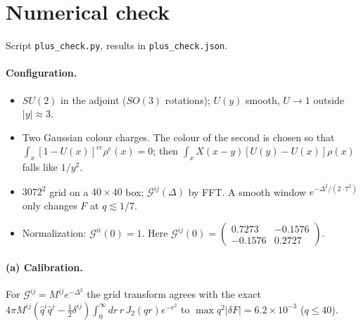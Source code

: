 \documentclass[10pt]{article}
\numberwithin{equation}{section}
\newcommand{\GG}{\mathcal G}
\begin{document}
\section{Numerical check}\label{sec:num}
Script \texttt{plus\_check.py}, results in \texttt{plus\_check.json}.
\paragraph{Configuration.}
\begin{itemize}
\item $SU(2)$ in the adjoint ($SO(3)$ rotations); $U(y)$ smooth, $U\to1$ outside $|y|\approx3$.
\item Two Gaussian colour charges. The colour of the second is chosen so that $\int_x[1-U(x)]^{ce}\rho^e(x)=0$; then $\int_xX(x-y)[U(y)-U(x)]\rho(x)$ falls like $1/y^2$.
\item $3072^2$ grid on a $40\times40$ box; $\GG^{ij}(\Delta)$ by FFT. A smooth window $e^{-\Delta^2/(2\cdot7^2)}$ only changes $F$ at $q\lesssim1/7$.
\item Normalization: $\GG^{ii}(0)=1$. Here $\GG^{ij}(0)=\begin{pmatrix}0.7273&-0.1576\\-0.1576&0.2727\end{pmatrix}$.
\end{itemize}
\paragraph{(a) Calibration.} For $\GG^{ij}=M^{ij}e^{-\Delta^2}$ the grid transform agrees with the exact $4\pi M^{ij}(\hat q^i\hat q^j-\frac12\delta^{ij})\int_0^\infty dr\,r\,J_2(qr)e^{-r^2}$ to $\max q^2|\delta F|=6.2\times10^{-3}$ ($q\le40$).
\end{document}

